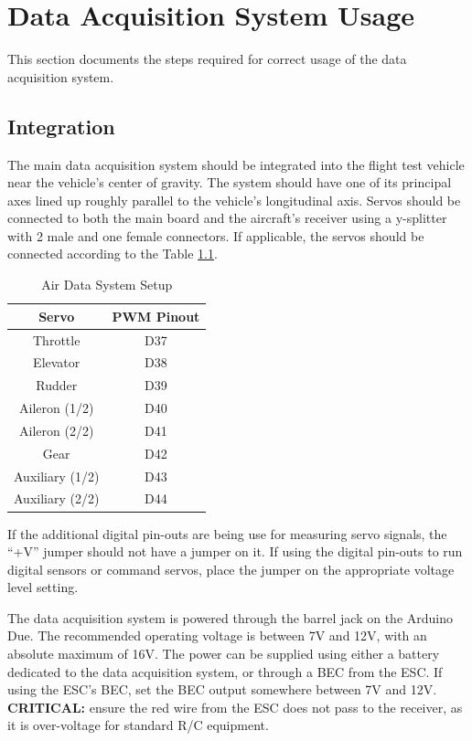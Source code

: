 \chapter{Data Acquisition System Usage}
\label{sect:systemUsage}
This section documents the steps required for correct usage of the data acquisition system.

\section{Integration}
The main data acquisition system should be integrated into the flight test vehicle near the vehicle's center of gravity. The system should have one of its principal axes lined up roughly parallel to the vehicle's longitudinal axis. Servos should be connected to both the main board and the aircraft's receiver using a y-splitter with 2 male and one female connectors. If applicable, the servos should be connected according to the Table \ref{table:servoSetup}.
\begin{table}[ht]
\caption{Air Data System Setup}
\centering
\begin{tabular}{c c}
\hline\hline
 Servo & PWM Pinout\\
\hline
Throttle & D37\\
Elevator & D38\\
Rudder & D39\\ 
Aileron (1/2) & D40\\
Aileron (2/2) & D41\\
Gear & D42\\
Auxiliary (1/2)& D43\\
Auxiliary (2/2)& D44\\
\hline
\end{tabular}
\label{table:servoSetup}
\end{table}

If the additional digital pin-outs are being use for measuring servo signals, the ``+V'' jumper should not have a jumper on it. If using the digital pin-outs to run digital sensors or command servos, place the jumper on the appropriate voltage level setting.

The data acquisition system is powered through the barrel jack on the Arduino Due. The recommended operating voltage is between 7V and 12V, with an absolute maximum of 16V. The power can be supplied using either a battery dedicated to the data acquisition system, or through a BEC from the ESC. If using the ESC's BEC, set the BEC output somewhere between 7V and 12V. \textbf{CRITICAL:} ensure the red wire from the ESC does not pass to the receiver, as it is over-voltage for standard R/C equipment.

